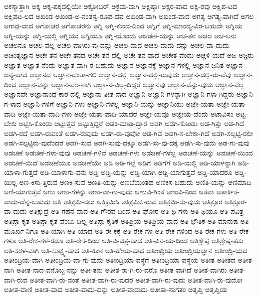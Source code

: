 {ಅಕಸ್ಮಾತ್ತಾಗಿ
ಅಕ್ಕ
ಅಕ್ಕ-ಪಕ್ಕದಲ್ಲಿಯೇ
ಅಕ್ಟೋಬರ್
ಅಕ್ರಮ-ವಾಗಿ
ಅಕ್ಲಿಷ್ಠಾಃ
ಅಕ್ಷರ-ವಾದ
ಅಕ್ಷ-ರವು
ಅಕ್ಷಿಪ-ಟದ
ಅಕ್ಷಿಪಟ-ಲದ
ಅಖಂಡ
ಅಖಂಡ-ಅ-ನಂತಸ್ವ-ರೂಪ-ದವ
ಅಖಂಡ-ವಾಗಿ
ಅಖಂಡ-ವಾದ
ಅಗತ್ಯ
ಅಗತ್ಯ-ವಾಗಿದೆ
ಅಗಲ
ಅಗಾಧ-ವಾದ
ಅಗೋಚರ
ಅಗೋಚರನು
ಅಗ್ನಿ
ಅಗ್ನಿ-ಕುಂಡ-ದಿಂದ
ಅಗ್ನಿಗೆ
ಅಗ್ನಿ-ಮಾಂದ್ಯ-ವಿರ-ಬಹುದೇ
ಅಗ್ನಿಯ
ಅಗ್ನಿ-ಯನ್ನು
ಅಗ್ನಿ-ಯಲ್ಲಿ
ಅಗ್ನಿಯು
ಅಗ್ನಿಯೂ
ಅಗ್ನಿ-ಯೊಂದು
ಅಚಡಣೆ-ಯನ್ನು
ಅಚ-ತನ
ಅಚಲ
ಅಚ-ಲನು
ಅಚಲನೂ
ಅಚಲ-ವಲ್ಲ
ಅಚಲ-ವಾಗಿರು-ವು-ದನ್ನು
ಅಚಲ-ವಾದ
ಅಚಲ-ವಾದು-ದನ್ನು
ಅಚಲ-ವಾ-ದುದು
ಅಚಿಂತ್ಯಜ್ಞಾನ
ಅಚೇ-ತನ
ಅಚೇ-ತನದ
ಅಚೇ-ತನ-ದಲ್ಲಿ
ಅಚೇ-ತನ-ವಾದ
ಅಚೇತ-ವೆಂದು
ಅಚ್ಚಳಿ-ಯದೆ
ಅಜ
ಅಜ್ಞರು
ಅಜ್ಞಾತ
ಅಜ್ಞಾತ-ನೆಂದು
ಅಜ್ಞಾತ-ವಾಗಿ-ರ-ಬಹುದು
ಅಜ್ಞಾನ
ಅಜ್ಞಾನಕ್ಕೆ
ಅಜ್ಞಾನ-ಗಳಲ್ಲಿ
ಅಜ್ಞಾನ-ಜನಿತ
ಅಜ್ಞಾನ-ಜನ್ಯ-ವಾದ
ಅಜ್ಞಾನದ
ಅಜ್ಞಾನ-ದಂತಾ-ಗಲಿ
ಅಜ್ಞಾನ-ದಲ್ಲಿ
ಅಜ್ಞಾನ-ದಲ್ಲಿ-ರುವುದು
ಅಜ್ಞಾನ-ದಲ್ಲಿ-ರು-ವೆವು
ಅಜ್ಞಾನ-ದಿಂದ
ಅಜ್ಞಾನ-ವನ್ನು
ಅಜ್ಞಾನ-ವಶ-ನಾಗಿ
ಅಜ್ಞಾ-ನ-ವಿಲ್ಲ-ದಿದ್ದರೆ
ಅಜ್ಞಾನವು
ಅಜ್ಞಾನ-ವೆನ್ನು-ವುದು
ಅಜ್ಞಾನ-ವೆಲ್ಲ
ಅಜ್ಞಾನವೇ
ಅಜ್ಞಾನಾಂಧ-ಕಾರ-ದಲ್ಲಿ
ಅಜ್ಞಾನಾ-ತೀತ-ನಾದ
ಅಜ್ಞಾನಿ
ಅಜ್ಞಾನಿ-ಗಳನ್ನಾಗಿ
ಅಜ್ಞಾನಿ-ಗಳಾ-ಗಿದ್ದರು
ಅಜ್ಞಾನಿ-ಗ-ಳಾದ
ಅಜ್ಞಾನಿ-ಗಳಿಗೆ
ಅಜ್ಞಾನಿ-ಗಳು
ಅಜ್ಞಾನಿ-ಗಳೆಲ್ಲ
ಅಜ್ಞಾನಿ-ಯನ್ನು
ಅಜ್ಞಾನಿಯು
ಅಜ್ಞೇ-ಯತಾ
ಅಜ್ಞೇ-ಯತಾ-ವಾದಿ
ಅಜ್ಞೇ-ಯತಾ-ವಾದಿ-ಗಳು
ಅಜ್ಞೇ-ಯತಾ-ವಾದಿ-ಯಾದರೆ
ಅಜ್ಞೇ-ಯವೂ
ಅಜ್ಞೇಯ-ವೆಂದು
ಅಟಾವಿಸಂ
ಅಟ್ಟ-ಬೇಕು
ಅಟ್ಟಿಸಿ-ಕೊಂಡು
ಅಟ್ಟುತ್ತವೆ
ಅಟ್ಟುತ್ತಿದ್ದರೆ
ಅಡಕ-ಮಾಡಿ-ದ್ದಾರೆ
ಅಡಗಿ
ಅಡಗಿ-ಕೊಂಡು
ಅಡ-ಗಿತ್ತು
ಅಡ-ಗಿದೆ
ಅಡಗಿ-ರದೆ
ಅಡಗಿ-ರುವಂತೆ
ಅಡಗಿ-ರುವುದು
ಅಡಗಿ-ರು-ವುವೋ
ಅಡ-ಗಿವೆ
ಅಡಗಿ-ಸ-ಬೇಕಾ-ಗಿದೆ
ಅಡಗಿ-ಸಲ್ಪಟ್ಟಿ-ರಲೀ
ಅಡಗಿ-ಸಲ್ಪಟ್ಟಿರು-ವುದೆಂದರೆ
ಅಡಗಿ-ಸುವ
ಅಡಗಿ-ಸುವು-ದಕ್ಕೂ
ಅಡಗಿ-ಸು-ವು-ದಕ್ಕೆ
ಅಡಗಿ-ಸು-ವುದು
ಅಡ-ಗು-ವುವು
ಅಡಚಣೆ
ಅಡಚಣೆ-ಗಳಾ-ವುವು
ಅಡಚಣೆ-ಗಳಿವೆ
ಅಡಚಣೆ-ಗಳು
ಅಡಚಣೆ-ಗಳೆಲ್ಲ
ಅಡಚಣೆ-ಯನ್ನು
ಅಡಚಣೆ-ಯಿಂದ
ಅಡಚಣೆ-ಯಿದೆ
ಅಡಚಣೆಯೂ
ಅಡಚಣೆಯೇ
ಅಡಿ
ಅಡಿ-ಗಲ್ಲೆ
ಅಡಿಗೆ
ಅಡಿಗೆಗೆ
ಅಡಿ-ಯಲ್ಲಿ
ಅಡಿ-ಯಾಳನ್ನಾಗಿ
ಅಡಿ-ಯಾಳಾ-ಗುತ್ತದೆ
ಅಡಿ-ಯಾಳಾಗು-ವನು
ಅಡ್ಡಿ
ಅಡ್ಡಿ-ಯನ್ನು
ಅಡ್ಡಿ-ಯಾಗಿ
ಅಡ್ಡಿ-ಯಾಗುತ್ತವೆ
ಅಡ್ಡಿ-ಯಾದರೂ
ಅಡ್ಡಿ-ಯಿಲ್ಲ
ಅಣ-ಕಿಸು-ತ್ತಿರುವ
ಅಣಕಿ-ಸುವ
ಅಣತಿ-ಯನ್ನು
ಅಣಬೆಯಂತಹ
ಅಣಿಕಿಸ-ಬಹುದು
ಅಣಿತಿ-ಯನ್ನು
ಅಣಿಮಾದಿ
ಅಣಿ-ಯಾಗುತ್ತವೆ
ಅಣು
ಅಣು-ಗಳನ್ನು
ಅಣು-ವಾ-ಗು-ವುದು
ಅಣುವಿ-ಗಿಂತ
ಅಣುವಿ-ನಿಂದ
ಅತವಾ
ಅತಾರ್ಕಿಕ-ವಾದು-ದೆನ್ನ-ಬಹುದು
ಅತಿ
ಅತಿಕ್ರಮಿ-ಸಲು
ಅತಿಕ್ರಮಿಸಿ
ಅತಿಕ್ರಮಿಸಿ-ರುವ
ಅತಿಕ್ರಮಿ-ಸು-ವುದು
ಅತಿಕ್ರೂರ
ಅತಿಕ್ರೂರ-ವಾ-ದುದು
ಅತಿಕ್ಷುದ್ರ
ಅತಿ-ಗಹನ-ವಾದ
ಅತಿ-ಗೌರವ-ದಿಂದ
ಅತಿ-ಘೋರ
ಅತಿ-ಥಿ-ಗಳು
ಅತಿ-ಥಿಯೂ
ಅತಿ-ಪವಿತ್ರ
ಅತಿಪ್ರಾ-ಕೃತ
ಅತಿಪ್ರಾ-ಕೃತ-ವೆಂಬು-ದಿಲ್ಲ
ಅತಿಪ್ರಾ-ಕೃತಿಕ
ಅತಿಪ್ರಿಯ
ಅತಿಪ್ರಿಯ-ವಾದ
ಅತಿ-ಭೌತಿಕ
ಅತಿ-ಮಾನುಷ
ಅತಿ-ಮೂರ್ಖ-ನಿಗೂ
ಅತಿ-ಯಾಗಿ
ಅತಿ-ಯಾದ
ಅತಿ-ರೇ-ಕಕ್ಕೆ
ಅತಿ-ರೇಕ-ಗಳ
ಅತಿ-ರೇಕ-ಗಳಿಂದ
ಅತಿ-ರೇಕ-ಗಳು
ಅತಿ-ರೇಕ-ಗಳೂ
ಅತಿ-ರೇಕ-ಗಳೆ-ರಡೂ
ಅತಿ-ರೇಕ-ದಿಂದ
ಅತಿ-ವಿ-ಚಿತ್ರ-ವಾದ
ಅತಿ-ವಿನ-ಯ-ದಿಂದ
ಅತಿಶ್ರೇಷ್ಠ
ಅತಿಶ್ರೇಷ್ಠ-ತಮ
ಅತಿ-ಸರಳ-ವಾಗಿ
ಅತಿ-ಸೂಕ್ಷ್ಮ-ವಾದ
ಅತಿ-ಹೀನ
ಅತಿ-ಹೇಯ-ವಾದ
ಅತೀಂದ್ರಿಯ
ಅತೀಂದ್ರಿಯಜ್ಞಾನ
ಅತೀಂದ್ರಿ-ಯದ
ಅತೀಂದ್ರಿಯ-ವಾಗಿ
ಅತೀಂದ್ರಿಯ-ವಾ-ಗು-ವುದು
ಅತೀಂದ್ರಿಯಾ-ವಸ್ಥೆಗೆ
ಅತೀಂದ್ರಿಯಾ-ವಸ್ಥೆಯ
ಅತೀತ
ಅತೀತದ
ಅತೀತ-ನಾಗಿ
ಅತೀತ-ನಾದ-ವನೊಬ್ಬ-ನನ್ನು
ಅತೀ-ತನು
ಅತೀತ-ರಾ-ಗಿ-ರು-ವರೊ
ಅತೀತ-ವಾಗಿದೆ
ಅತೀತ-ವಾಗಿರು
ಅತೀತ-ವಾಗಿ-ರುವ
ಅತೀತ-ವಾಗಿ-ರು-ವಂತೆ
ಅತೀತ-ವಾಗಿ-ರು-ವುದರ
ಅತೀತ-ವಾಗಿ-ರು-ವುದು
ಅತೀತ-ವಾಗಿ-ರು-ವುದೋ
ಅತೀತ-ವಾಣಿ
ಅತೀತ-ವಾದ
ಅತೀತ-ವಾದು-ದನ್ನು
ಅತೀತ-ವಾದುದು
ಅತೀತಾ-ನಾಗತಂ
ಅತೃಪ್ತಿ
ಅತೃಪ್ತಿಯ
}
